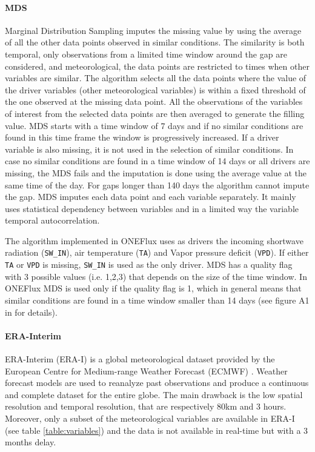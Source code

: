 \documentclass{article}
\begin{document}
\paragraph{MDS} Marginal Distribution Sampling \cite{reichstein_separation_2005-3} imputes the missing value by using the average of all the other data points observed in similar conditions. The similarity is both temporal, only observations from a limited time window around the gap are considered, and meteorological, the data points are restricted to times when other variables are similar. 
The algorithm selects all the data points where the value of the driver variables (other meteorological variables) is within a fixed threshold of the one observed at the missing data point. All the observations of the variables of interest from the selected data points are then averaged to generate the filling value. MDS starts with a time window of 7 days and if no similar conditions are found in this time frame the window is progressively increased. If a driver variable is also missing, it is not used in the selection of similar conditions. 
In case no similar conditions are found in a time window of 14 days or all drivers are missing, the MDS fails and the imputation is done using the average value at the same time of the day. For gaps longer than 140 days the algorithm cannot impute the gap.
MDS imputes each data point and each variable separately. It mainly uses statistical dependency between variables and in a limited way the variable temporal autocorrelation. 

The algorithm implemented in \textsf{ONEFlux} uses as drivers the incoming shortwave radiation (\texttt{SW\_IN}), air temperature (\texttt{TA}) and Vapor pressure deficit (\texttt{VPD}). If either \texttt{TA} or \texttt{VPD} is missing, \texttt{SW\_IN} is used as the only driver. 
MDS has a quality flag with 3 possible values (i.e. 1,2,3) that depends on the size of the time window. In \textsf{ONEFlux} MDS is used only if the quality flag is 1, which in general means that similar conditions are found in a time window smaller than 14 days (see figure A1 in  \textcite{reichstein_separation_2005-3} for details). 

\paragraph{ERA-Interim} ERA-Interim (ERA-I) is a global meteorological dataset provided by the European Centre for Medium-range Weather Forecast (ECMWF) \cite{dee_era-interim_2011}. Weather forecast models are used to reanalyze past observations and produce a continuous and complete dataset for the entire globe. The main drawback is the low spatial resolution and temporal resolution, that are respectively 80km and 3 hours. Moreover, only a subset of the meteorological variables are available in ERA-I (see table \ref{table:variables}) and the data is not available in real-time but with a 3 months delay.
\end{document}
